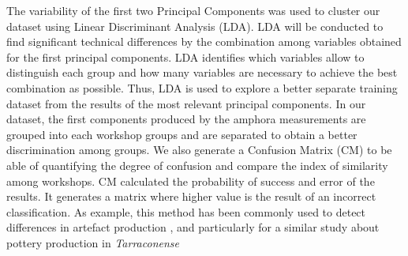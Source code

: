 \documentclass[review]{elsarticle}
\begin{document}
The variability of the first two Principal Components was used to cluster our dataset using Linear Discriminant Analysis (LDA). LDA will be conducted to find significant technical differences by the combination among variables obtained for the first principal components. LDA identifies which variables allow to distinguish each group and how many variables are necessary to achieve the best combination as possible. Thus, LDA is used to explore a better separate training dataset from the results of the most relevant principal components. In our dataset, the first components produced by the amphora measurements are grouped into each workshop groups and are separated to obtain a better discrimination among groups. 
We also generate a Confusion Matrix (CM) to be able of quantifying the degree of confusion and compare the index of similarity among workshops.  CM calculated the probability of success and error of the results. It generates a matrix where higher value is the result of an incorrect classification. As example, this method has been commonly used to detect differences in artefact production \citep{charlton_investigating_2012, thorpe_distribution_1984}, and particularly for a similar study about pottery production in \emph{Tarraconense} \citep{i_martin_alisis_1998}


\end{document}
